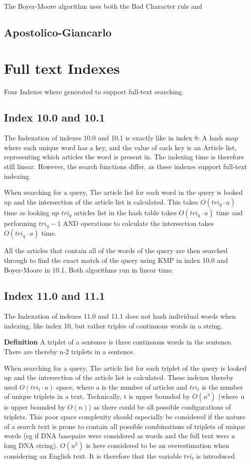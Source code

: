 The Boyer-Moore algorithm uses both the Bad Character rule and 



\subsection{Apostolico-Giancarlo}


\section{Full text Indexes}\label{sec:index10}
Four Indexes where generated to support full-text searching.

\subsection{Index 10.0 and 10.1}
The Indexation of indexes 10.0 and 10.1 is exactly like in index 8: A hash map where each unique word has a key, and the value of each key is an Article list, representing which articles the word is present in. The indexing time is therefore still linear. However, the search functions differ, as these indexes support full-text indexing.

When searching for a query, The article list for each word in the query is looked up and the intersection of the article list is calculated. This takes $O(tri_q\cdot a)$ time as looking up $tri_q$ articles list in the hash table takes $O(tri_q\cdot a)$ time and performing $tri_q - 1 $ AND operations to calculate the intersection takes $O(tri_q\cdot a)$ time.

All the articles that contain all of the words of the query are then searched through to find the exact match of the query using KMP in index 10.0 and Boyer-Moore in 10.1. Both algorithms run in linear time. 

\subsection{Index 11.0 and 11.1}
The Indexation of indexes 11.0 and 11.1 does not hash individual words when indexing, like index 10, but rather triples of continuous words in a string. 

\textbf{Definition} A triplet of a sentence is three continuous words in the sentence. There are thereby n-2 triplets in a sentence.

When searching for a query, The article list for each triplet of the query is looked up and the intersection of the article list is calculated. These indexes thereby used $O(tri_t\cdot a)$ space, where a is the number of articles and $tri_t$ is the number of unique triplets in a text. Technically, t is upper bounded by $O(u^3)$ (where u is upper bounded by $O(n)$) as there could be all possible configurations of triplets. This poor space complexity should especially be considered if the nature of a search text is prone to contain all possible combinations of triplets of unique words (eg if DNA basepairs were considered as words and the full text were a long DNA string).  $O(u^3)$ is here considered to be an overestimation when considering an English text. It is therefore that the variable $tri_t$ is introduced.


